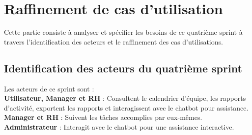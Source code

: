 \section{Raffinement de cas d'utilisation}
Cette partie consiste à analyser et spécifier les besoins de ce quatrième sprint à travers l’identification des acteurs et le raffinement des cas d’utilisations.

\subsection{Identification des acteurs du quatrième sprint}
Les acteurs de ce sprint sont : \\
    \textbf{Utilisateur, Manager et RH} : Consultent le calendrier d’équipe, les rapports d’activité, exportent les rapports et interagissent avec le chatbot pour assistance. \\
    \textbf{Manager et RH} : Suivent les tâches accomplies par eux-mêmes. \\
    \textbf{Administrateur} : Interagit avec le chatbot pour une assistance interactive. \\
